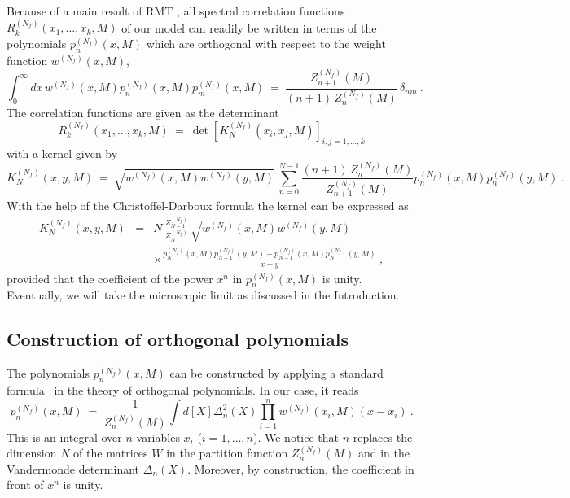 Because of a main result of RMT \cite{Meht91}, all spectral
correlation functions $R_k^{(N_f)}(x_1,\ldots,x_k,M)$ of our model can
readily be written in terms of the polynomials $p_n^{(N_f)}(x,M)$
which are orthogonal with respect to the weight function
$w^{(N_f)}(x,M)$,
\begin{equation}
  \int_0^\infty dx \, w^{(N_f)}(x,M) p_n^{(N_f)}(x,M) p_m^{(N_f)}(x,M)
  \ = \ 
  \frac{Z_{n+1}^{(N_f)}(M)}{(n+1)\,Z_n^{(N_f)}(M)} \, \delta_{nm} \ .
\label{ortho}
\end{equation} 
The correlation functions are given as the determinant
\begin{equation}
R_k^{(N_f)}(x_1,\ldots,x_k,M) \ = \ 
  \det\left[K_N^{(N_f)}(x_i,x_j,M)\right]_{i,j=1,\ldots,k}
\label{corrfct}
\end{equation}
with a kernel given by
\begin{equation}
K_N^{(N_f)}(x,y,M) \ = \ \sqrt{w^{(N_f)}(x,M)w^{(N_f)}(y,M)} \,
                 \sum_{n=0}^{N-1}   
                \frac{(n+1)\,Z_n^{(N_f)}(M)}{Z_{n+1}^{(N_f)}(M)}
                p_n^{(N_f)}(x,M) p_n^{(N_f)}(y,M) \ .
\label{summe}
\end{equation}
With the help of the Christoffel-Darboux formula the kernel
can be expressed as
\begin{eqnarray}
K_N^{(N_f)}(x,y,M) & = & N \, \frac{Z_{N-1}^{(N_f)}}{Z_N^{(N_f)}} \,
                 \sqrt{w^{(N_f)}(x,M)w^{(N_f)}(y,M)} \nonumber\\
  &&\times \frac{p_N^{(N_f)}(x,M)p_{N-1}^{(N_f)}(y,M)
    -p_{N-1}^{(N_f)}(x,M)p_N^{(N_f)}(y,M)}{x-y} \ ,
\label{kernel}
\end{eqnarray}
provided that the coefficient of the power $x^n$ in $p_n^{(N_f)}(x,M)$
is unity.  Eventually, we will take the microscopic limit as discussed
in the Introduction.


\subsection{Construction of orthogonal polynomials}
\label{sec22}

The polynomials $p_n^{(N_f)}(x,M)$ can be constructed by applying a
standard formula~\cite{Bate51} in the theory of orthogonal
polynomials. In our case, it reads
\begin{equation}
p_n^{(N_f)}(x,M) \ = \ \frac{1}{Z_n^{(N_f)}(M)} 
                     \int d[X] \Delta_n^2(X) 
                    \prod_{i=1}^n w^{(N_f)} (x_i,M) (x-x_i) \ .
\label{poly}
\end{equation}
This is an integral over $n$ variables $x_i$ ($i=1,\ldots,n$). We
notice that $n$ replaces the dimension $N$ of the matrices $W$ in the
partition function $Z_n^{(N_f)}(M)$ and in the Vandermonde determinant
$\Delta_n(X)$. Moreover, by construction, the coefficient in front
of $x^n$ is unity.

